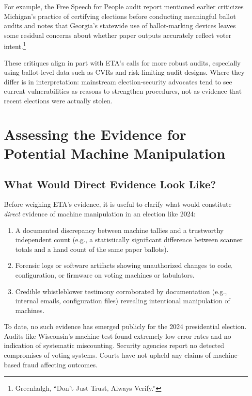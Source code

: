 \documentclass[12pt]{article}
\begin{document}
For example, the Free Speech for People audit report mentioned earlier criticizes Michigan's practice of certifying elections before conducting meaningful ballot audits and notes that Georgia's statewide use of ballot-marking devices leaves some residual concerns about whether paper outputs accurately reflect voter intent.\footnote{Greenhalgh, ``Don't Just Trust, Always Verify.''}

These critiques align in part with ETA's calls for more robust audits, especially using ballot-level data such as CVRs and risk-limiting audit designs. Where they differ is in interpretation: mainstream election-security advocates tend to see current vulnerabilities as reasons to strengthen procedures, not as evidence that recent elections were actually stolen.

\section{Assessing the Evidence for Potential Machine Manipulation}

\subsection{What Would Direct Evidence Look Like?}

Before weighing ETA's evidence, it is useful to clarify what would constitute \emph{direct} evidence of machine manipulation in an election like 2024:

\begin{enumerate}
    \item A documented discrepancy between machine tallies and a trustworthy independent count (e.g., a statistically significant difference between scanner totals and a hand count of the same paper ballots).
    \item Forensic logs or software artifacts showing unauthorized changes to code, configuration, or firmware on voting machines or tabulators.
    \item Credible whistleblower testimony corroborated by documentation (e.g., internal emails, configuration files) revealing intentional manipulation of machines.
\end{enumerate}

To date, no such evidence has emerged publicly for the 2024 presidential election. Audits like Wisconsin's machine test found extremely low error rates and no indication of systematic miscounting. Security agencies report no detected compromises of voting systems. Courts have not upheld any claims of machine-based fraud affecting outcomes.
\end{document}
